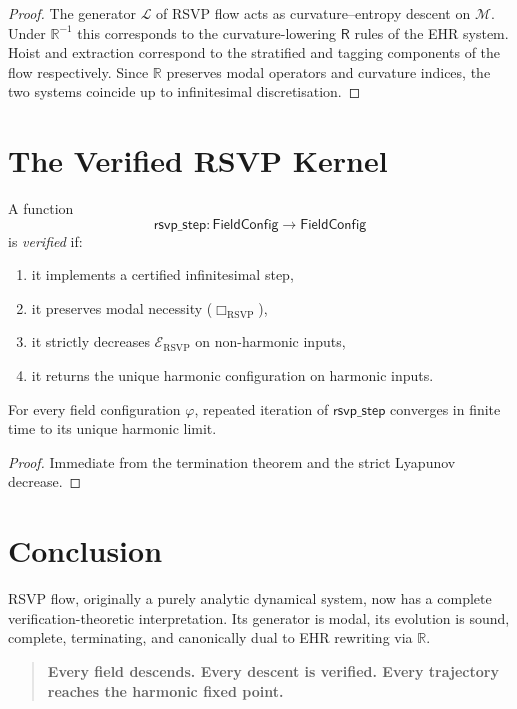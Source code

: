 \begin{proof}
The generator $\mathcal{L}$ of RSVP flow acts as curvature–entropy descent on 
$\mathcal{M}$.
Under $\mathbb{R}^{-1}$ this corresponds to the curvature-lowering $\mathsf{R}$ 
rules of the EHR system.
Hoist and extraction correspond to the stratified and tagging components of 
the flow respectively.  
Since $\mathbb{R}$ preserves modal operators and curvature indices, the two 
systems coincide up to infinitesimal discretisation.
\end{proof}

\section{The Verified RSVP Kernel}

\begin{definition}
A function
\[
\mathsf{rsvp\_step}:\mathsf{FieldConfig}\to\mathsf{FieldConfig}
\]
is \emph{verified} if:
\begin{enumerate}
\item it implements a certified infinitesimal step,
\item it preserves modal necessity ($\Box_{\mathrm{RSVP}}$),
\item it strictly decreases $\mathcal{E}_{\mathrm{RSVP}}$ on non-harmonic inputs,
\item it returns the unique harmonic configuration on harmonic inputs.
\end{enumerate}
\end{definition}

\begin{theorem}
For every field configuration $\varphi$, repeated iteration of 
$\mathsf{rsvp\_step}$ converges in finite time to its unique harmonic limit.
\end{theorem}

\begin{proof}
Immediate from the termination theorem and the strict Lyapunov decrease.
\end{proof}

\section{Conclusion}

RSVP flow, originally a purely analytic dynamical system, now has a complete 
verification-theoretic interpretation.  
Its generator is modal, its evolution is sound, complete, terminating, and 
canonically dual to EHR rewriting via $\mathbb{R}$.

\bigskip
\begin{quote}
\textbf{Every field descends.  
Every descent is verified.  
Every trajectory reaches the harmonic fixed point.}
\end{quote}

